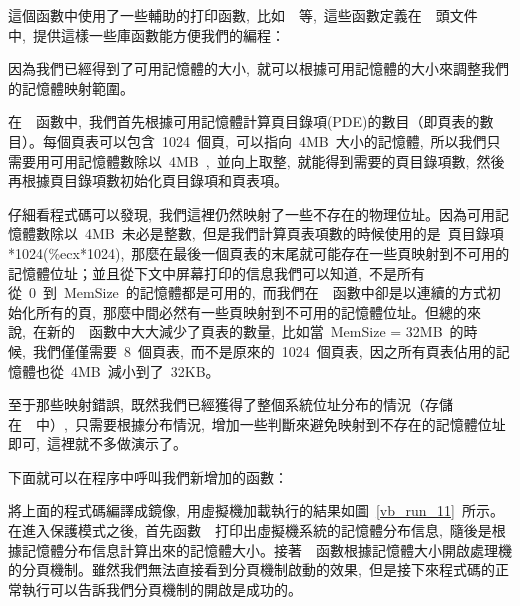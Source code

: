 這個函數中使用了一些輔助的打印函數,~比如~~等,~這些函數定義在~~頭文件中,~提供這樣一些庫函數能方便我們的編程：


因為我們已經得到了可用記憶體的大小,~就可以根據可用記憶體的大小來調整我們的記憶體映射範圍。


在~~函數中,~我們首先根據可用記憶體計算頁目錄項(PDE)的數目（即頁表的數目）。每個頁表可以包含~1024~個頁,~可以指向~4MB~大小的記憶體,~所以我們只需要用可用記憶體數除以~4MB~,~並向上取整,~就能得到需要的頁目錄項數,~然後再根據頁目錄項數初始化頁目錄項和頁表項。

仔細看程式碼可以發現,~我們這裡仍然映射了一些不存在的物理位址。因為可用記憶體數除以~4MB~未必是整數,~但是我們計算頁表項數的時候使用的是~頁目錄項*1024(\%ecx*1024),~那麼在最後一個頁表的末尾就可能存在一些頁映射到不可用的記憶體位址；並且從下文中屏幕打印的信息我們可以知道,~不是所有從~0~到~MemSize~的記憶體都是可用的,~而我們在~~函數中卻是以連續的方式初始化所有的頁,~那麼中間必然有一些頁映射到不可用的記憶體位址。但總的來說,~在新的~~函數中大大減少了頁表的數量,~比如當~MemSize = 32MB~的時候,~我們僅僅需要~8~個頁表,~而不是原來的~1024~個頁表,~因之所有頁表佔用的記憶體也從~4MB~減小到了~32KB。

至于那些映射錯誤,~既然我們已經獲得了整個系統位址分布的情況（存儲在~~中）,~只需要根據分布情況,~增加一些判斷來避免映射到不存在的記憶體位址即可,~這裡就不多做演示了。

下面就可以在程序中呼叫我們新增加的函數：


將上面的程式碼編譯成鏡像,~用虛擬機加載執行的結果如圖~\ref{vb_run_11}~所示。在進入保護模式之後,~首先函數~~打印出虛擬機系統的記憶體分布信息,~隨後是根據記憶體分布信息計算出來的記憶體大小。接著~~函數根據記憶體大小開啟處理機的分頁機制。雖然我們無法直接看到分頁機制啟動的效果,~但是接下來程式碼的正常執行可以告訴我們分頁機制的開啟是成功的。

